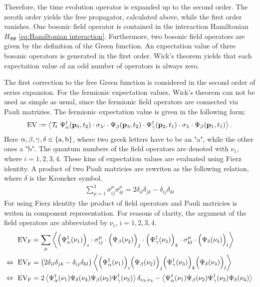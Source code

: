 Therefore, the time evolution operator is expanded up to the second order.
The zeroth order yields the free propagator, calculated above, while the first order vanishes.
One bosonic field operator is contained in the interaction Hamiltonian $H_{\Psi\Phi}$ \eqref{eq:Hamiltonian interaction}.
Furthermore, two bosonic field operators are given by the definition of the Green function.
An expectation value of three bosonic operators is generated in the first order.
Wick's theorem yields that each expectation value of an odd number of operators is always zero.

The first correction to the free Green function is considered in the second order of series expansion.
For the fermionic expectation values, Wick's theorem can not be used as simple as usual, since the fermionic field operators are connected via Pauli matrizies.
The fermionic expectation value is given in the following form:
%
\begin{align}
	\mathrm{EV} := \expval{\mathcal{T}_{t}\ \Psi_{\alpha}^{\dag}(\vb{p}_{4}, t_{2}) \cdot \sigma_{\lambda'} \cdot \Psi_{\beta}(\vb{p}_{3}, t_{2}) \cdot \Psi_{\gamma}^{\dag}(\vb{p}_{2}, t_{1}) \cdot \sigma_{\lambda} \cdot \Psi_{\beta}(\vb{p}_{1}, t_{1})}.
	\label{appeq:structure of fermionic expval}
\end{align}
%
Here $\alpha,\beta,\gamma,\delta \in \{\mathrm{a},\mathrm{b}\}$, where two greek letters have to be an "a", while the other ones a "b".
The quantum numbers of the field operators are denoted with $\nu_{i}$, where $i=1,2,3,4$.
These kins of expectation values are evaluated using Fierz identity.
A product of two Pauli matricies are rewriten as the following relation, where $\delta$ is the Kroncker symbol. 
%
\begin{align}
	\sum\limits_{\mu = 1}^{3} \sigma_{ij}^{\mu} \sigma_{kl}^{\mu} = 2 \delta_{il} \delta_{jk} - \delta_{ij} \delta_{kl}
	\label{appeq:Fierz identity}
\end{align}
%
For using Fierz identity the product of field operators and Pauli matricies is writen in component representation.
For reasons of clarity, the argument of the field operators are abbreviated by $\nu_{i}$, $i=1,2,3,4$.
%
\begin{align}
	\mathrm{EV}_{\mathrm{F}} &= \sum\limits_{\mu} \expval{\Big(\Psi_{\alpha}^{\dag}(\nu_{1})\Big)_{i} \cdot \sigma_{ij}^{\mu} \cdot \Big(\Psi_{\beta}(\nu_{2})\Big)_{j} \cdot \Big(\Psi_{\gamma}^{\dag}(\nu_{3})\Big)_{k} \cdot \sigma_{kl}^{\mu} \cdot \Big(\Psi_{\delta}(\nu_{4})\Big)_{l}}
	\notag \\ 
	\Leftrightarrow\ \mathrm{EV}_{\mathrm{F}} &= \big(2 \delta_{il} \delta_{jk} - \delta_{ij} \delta_{kl}\big) \expval{\Big(\Psi_{\alpha}^{\dag}(\nu_{1})\Big)_{i} \Big(\Psi_{\beta}(\nu_{2})\Big)_{j} \Big(\Psi_{\gamma}^{\dag}(\nu_{3})\Big)_{k} \Big(\Psi_{\delta}(\nu_{4})\Big)_{l}}
	\notag \\ 
	\Leftrightarrow\ \mathrm{EV}_{\mathrm{F}} &= 
		2 \expval{
			\Psi_{\alpha}^{\dag}(\nu_{1}) 
			\Psi_{\delta}(\nu_{4})
			\Psi_{\beta}(\nu_{2})
			\Psi_{\gamma}^{\dag}(\nu_{3})
		}
		\delta_{\nu_{3},\nu_{4}}
		-
		\expval{
			\Psi_{\alpha}^{\dag}(\nu_{1})
			\Psi_{\beta}(\nu_{2})
			\Psi_{\gamma}^{\dag}(\nu_{3})
			\Psi_{\delta}(\nu_{4})
		}
	\label{appeq:general expectation value after Fierz identity}
\end{align}
